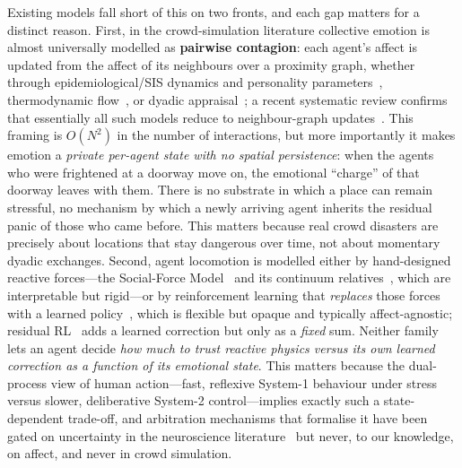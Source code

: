 \documentclass[sigconf,nonacm]{acmart}
\begin{document}
Existing models fall short of this on two fronts, and each gap matters for a distinct reason. First, in the crowd-simulation literature collective emotion is almost universally modelled as \textbf{pairwise contagion}: each agent's affect is updated from the affect of its neighbours over a proximity graph, whether through epidemiological/SIS dynamics and personality parameters~\cite{durupinar2008,durupinar2016}, thermodynamic flow~\cite{bosse2013ascribe}, or dyadic appraisal~\cite{tsai2011escapes}; a recent systematic review confirms that essentially all such models reduce to neighbour-graph updates~\cite{vanhaeringen2023}. This framing is $O(N^2)$ in the number of interactions, but more importantly it makes emotion a \emph{private per-agent state with no spatial persistence}: when the agents who were frightened at a doorway move on, the emotional ``charge'' of that doorway leaves with them. There is no substrate in which a place can remain stressful, no mechanism by which a newly arriving agent inherits the residual panic of those who came before. This matters because real crowd disasters are precisely about locations that stay dangerous over time, not about momentary dyadic exchanges. Second, agent locomotion is modelled either by hand-designed reactive forces---the Social-Force Model~\cite{helbing1995} and its continuum relatives~\cite{treuille2006}, which are interpretable but rigid---or by reinforcement learning that \emph{replaces} those forces with a learned policy~\cite{long2018,chen2017cadrl,everett2018gacadrl}, which is flexible but opaque and typically affect-agnostic; residual RL~\cite{johannink2019} adds a learned correction but only as a \emph{fixed} sum. Neither family lets an agent decide \emph{how much to trust reactive physics versus its own learned correction as a function of its emotional state}. This matters because the dual-process view of human action---fast, reflexive System-1 behaviour under stress versus slower, deliberative System-2 control---implies exactly such a state-dependent trade-off, and arbitration mechanisms that formalise it have been gated on uncertainty in the neuroscience literature~\cite{daw2005,lee2014} but never, to our knowledge, on affect, and never in crowd simulation.
\end{document}
